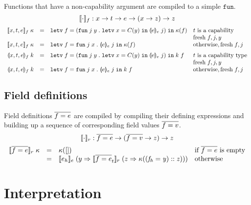 \documentclass[11pt]{article}
\newcommand{\kw}[1]{\mathtt{#1}}
\begin{document}
Functions that have a non-capability argument are compiled to a simple $\kw{fun}$.
\[
    \cmpn{f} : x -> t -> e -> (x -> z) -> z
\]
\[
\begin{array}{rclll}
\cmpk{f}{x, t, e} & = &
  \letv{f}{(\funv{j}{y}{\letv{x}{\prmv{C}{y}}{\tcmpin{e}{e}{j}}})}{\kappa(f)} &
  \text{$t$ is a capability} \\
  & & &  \fresh{f, j, y} \\
\cmpk{f}{x, t, e} & = &
  \letv{f}{\funv{j}{x}{\tcmpin{e}{e}{j}}}{\kappa(f)} & \text{otherwise}, \fresh{f, j} \medskip \\

\tcmpk{f}{x, t, e} & = &
  \letv{f}{(\funv{j}{y}{\letv{x}{\prmv{C}{y}}{\tcmpin{e}{e}{j}}})}{\appc{k}{f}} &
  \text{$t$ is a capability type} \\
  & & &  \fresh{f, j, y} \\
\tcmpk{f}{x, t, e} & = &
  \letv{f}{\funv{j}{x}{\tcmpin{e}{e}{j}}}{\appc{k}{f}} & \text{otherwise}, \fresh{f, j}
\end{array}
\]

\subsection*{Field definitions}

Field definitions $\flds{f}{e}$ are compiled by compiling their defining expressions and building up a sequence of corresponding field values $\flds{f}{v}$.
\[
    \cmpn{r} : \flds{f}{e} -> (\flds{f}{v} -> z) -> z
\]
\[
\begin{array}{rcll}
\cmpk{r}{\flds{f}{e}}
  & = & \kappa([]) & \text{if $\flds{f}{e}$ is empty} \\
  & = & \cmpin{e}{e_h}{(y =>
          \cmpin{r}{\flds{f}{e}_t}{(z =>
            \kappa(\cons{(\flde{f_h}{y})}{z}))})}
      & \text{otherwise} \\
\end{array}
\]

\newpage

\section{Interpretation}

\newcommand{\interp}[2]{#1 |- #2 \Downarrow}

\newcommand{\conf}[3]{\lambda #1 #2 . #3}
\newcommand{\conc}[2]{\lambda #1 . #2}

\newcommand{\clsf}[4]{\langle #1, \conf{#2}{#3}{#4} \rangle}
\newcommand{\clsc}[3]{\langle #1, \conc{#2}{#3} \rangle}
\newcommand{\clsfs}[5]{\langle #1, \rep{\lambda #2 #3 #4 . #5} \rangle}
\newcommand{\clsffs}[2]{\langle #1, \rep{#2} \rangle}
\end{document}
